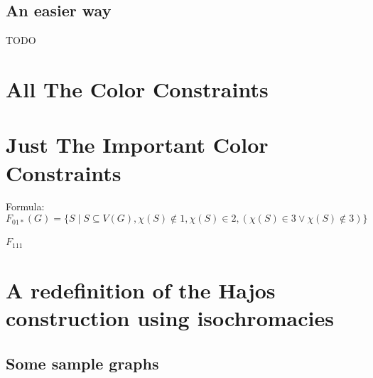 \documentclass{article}
\begin{document}
\subsection{An easier way}
TODO

\section{All The Color Constraints}



\label{color_constraints}
\section{Just The Important Color Constraints}

Formula:
\[
    F_{01*}(G) = \{S \mid S \subseteq V(G), \chi(S) \not\in 1, \chi(S) \in 2, (\chi(S) \in 3 \lor \chi(S) \not\in 3) \}
\]

\begin{description}
\item[$F_{111}$]
\end{description}


\section{A redefinition of the Hajos construction using isochromacies}

\subsection{Some sample graphs}
\end{document}
